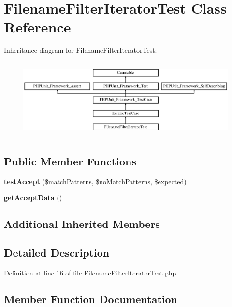\section{Filename\+Filter\+Iterator\+Test Class Reference}
\label{class_symfony_1_1_component_1_1_finder_1_1_tests_1_1_iterator_1_1_filename_filter_iterator_test}
Inheritance diagram for Filename\+Filter\+Iterator\+Test\+:\begin{figure}[H]
\begin{center}
\leavevmode
\includegraphics[height=4.129793cm]{class_symfony_1_1_component_1_1_finder_1_1_tests_1_1_iterator_1_1_filename_filter_iterator_test}
\end{center}
\end{figure}
\subsection*{Public Member Functions}
\begin{DoxyCompactItemize}
\item 
{\bf test\+Accept} (\$match\+Patterns, \$no\+Match\+Patterns, \$expected)
\item 
{\bf get\+Accept\+Data} ()
\end{DoxyCompactItemize}
\subsection*{Additional Inherited Members}


\subsection{Detailed Description}


Definition at line 16 of file Filename\+Filter\+Iterator\+Test.\+php.



\subsection{Member Function Documentation}

